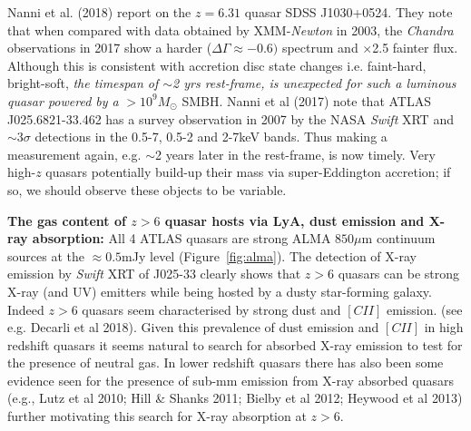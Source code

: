 \smallskip
\smallskip
\noindent
Nanni et al. (2018) report on the $z = 6.31$ quasar SDSS
J1030+0524. They note that when compared with data obtained by
XMM-{\it Newton} in 2003, the {\it Chandra} observations in 2017 show
a harder ($\Delta \Gamma \approx -0.6)$ spectrum and $\times$2.5
fainter flux. Although this is consistent with accretion disc state
changes i.e.  faint-hard, bright-soft, {\it the timespan of $\sim$2
yrs rest-frame, is unexpected for such a luminous quasar powered by a} 
$>$$10^{9} M_{\odot}$ SMBH. Nanni et al (2017) note that ATLAS
J025.6821-33.462 has a survey observation in 2007 by the NASA {\it
Swift} XRT and $\sim$3$\sigma$ detections in the 0.5-7, 0.5-2 and
2-7keV bands.  Thus making a measurement again, e.g. $\sim$2 years
later in the rest-frame, is now timely. Very high-$z$ quasars
potentially build-up their mass via super-Eddington accretion; if so,
we should observe these objects to be variable.

\vspace{-28pt}
\noindent
{\bf The gas content of $z>6$ quasar hosts via LyA, dust emission and
X-ray absorption:} All 4 ATLAS quasars are strong ALMA $850\mu$m
continuum sources at the $\approx0.5$mJy level
(Figure~\ref{fig:alma}). The detection of X-ray emission by {\it
Swift} XRT of J025-33 clearly shows that $z>6$ quasars can be strong
X-ray (and UV) emitters while being hosted by a dusty star-forming
galaxy. Indeed $z>6$ quasars seem characterised by strong dust and
$[CII]$ emission. (see e.g. Decarli et al 2018). Given this prevalence
of dust emission and $[CII]$ in high redshift quasars it seems natural
to search for absorbed X-ray emission to test for the presence of
neutral gas. In lower redshift quasars there has also been some
evidence seen for the presence of sub-mm emission from X-ray absorbed
quasars (e.g., Lutz et al 2010; Hill \& Shanks 2011; Bielby et al
2012; Heywood et al 2013) further motivating this search for X-ray
absorption at $z>6$.


